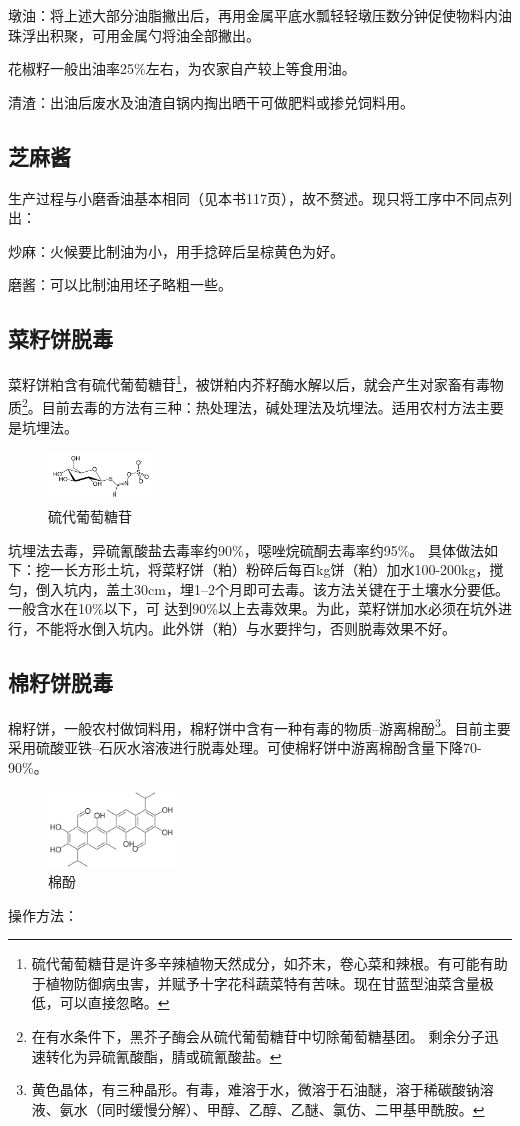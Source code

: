 \documentclass{ctexbook}
\begin{document}
墩油：将上述大部分油脂撇出后，再用金属平底水瓢轻轻墩压数分钟促使物料内油珠浮出积聚，可用金属勺将油全部撇出。

花椒籽一般出油率25\%左右，为农家自产较上等食用油。

清渣：出油后废水及油渣自锅内掏出晒干可做肥料或掺兑饲料用。
\subsection{芝麻酱}
生产过程与小磨香油基本相同（见本书117页），故不赘述。现只将工序中不同点列出：

炒麻：火候要比制油为小，用手捻碎后呈棕黄色为好。

磨酱：可以比制油用坯子略粗一些。
\subsection{菜籽饼脱毒}
菜籽饼粕含有硫代葡萄糖苷\footnote{硫代葡萄糖苷是许多辛辣植物天然成分，如芥末，卷心菜和辣根。有可能有助于植物防御病虫害，并赋予十字花科蔬菜特有苦味。现在甘蓝型油菜含量极低，可以直接忽略。}，被饼粕内芥籽酶水解以后，就会产生对家畜有毒物质\footnote{在有水条件下，黑芥子酶会从硫代葡萄糖苷中切除葡萄糖基团。
剩余分子迅速转化为异硫氰酸酯，腈或硫氰酸盐。}。目前去毒的方法有三种：热处理法，碱处理法及坑埋法。适用农村方法主要是坑埋法。
\begin{figure}[H]
	\centering
	\includegraphics[width=0.25\textwidth]{liugan.png}
	\caption{硫代葡萄糖苷}
\end{figure}
坑埋法去毒，异硫氰酸盐去毒率约90\%，噁唑烷硫酮去毒率约95\%。
具体做法如下：挖一长方形土坑，将菜籽饼（粕）粉碎后每百kg饼（粕）加水100-200kg，搅匀，倒入坑内，盖土30cm，埋1--2个月即可去毒。该方法关键在于土壤水分要低。一般含水在10\%以下，可
达到90\%以上去毒效果。为此，菜籽饼加水必须在坑外进行，不能将水倒入坑内。此外饼（粕）与水要拌匀，否则脱毒效果不好。
\subsection{棉籽饼脱毒}
棉籽饼，一般农村做饲料用，棉籽饼中含有一种有毒的物质--游离棉酚\footnote{黄色晶体，有三种晶形。有毒，难溶于水，微溶于石油醚，溶于稀碳酸钠溶液、氨水（同时缓慢分解）、甲醇、乙醇、乙醚、氯仿、二甲基甲酰胺。}。目前主要采用硫酸亚铁--石灰水溶液进行脱毒处理。可使棉籽饼中游离棉酚含量下降70-90\%。
\begin{figure}[H]
	\centering
	\includegraphics[width=0.3\textwidth]{mianfen.png}
	\caption{棉酚}
\end{figure}
操作方法：
\end{document}
